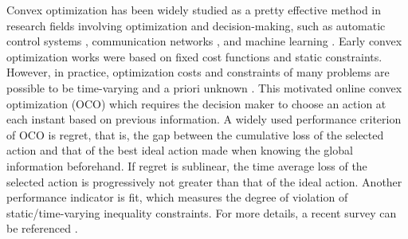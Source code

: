 \documentclass[letterpaper, 10 pt, conference]{ieeeconf}  %
\begin{document}
Convex optimization has been widely studied as a pretty effective method in research fields involving optimization and decision-making, such as automatic control systems \cite{ran1996}, communication networks \cite{luo2003}, and machine learning \cite{qiu2016}. %
Early convex optimization works were based on fixed cost functions and static constraints.
However, in practice, optimization costs and constraints of many problems are possible to be time-varying and a priori unknown \cite{ss2011}. This motivated  online convex optimization (OCO) which requires the decision maker to choose an action at each instant based on previous information. 
A widely used performance criterion of OCO is regret, that is, the gap between the cumulative loss of the selected action and that of the best ideal action made when knowing the global information beforehand. If regret is sublinear, the time average loss of the selected action is progressively not greater than that of the ideal action. Another performance indicator is fit, which measures the degree of violation of static/time-varying inequality constraints. For more details, a recent survey can be referenced \cite{li2022sur}.
\end{document}
